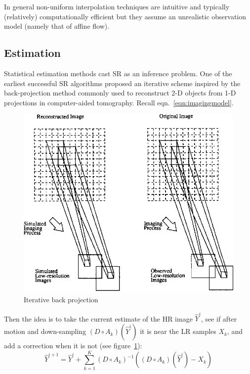In general non-uniform interpolation techniques are intuitive and typically (relatively) computationally efficient but they assume an unrealistic observation model (namely that of affine flow).

\subsection{Estimation}\label{subsec:estimation}

Statistical estimation methods cast SR as an inference problem.
%
One of the earliest successful SR algorithms\cite{Irani1991ImprovingRB} proposed an iterative scheme inspired by the back-projection method commonly used to reconstruct 2-D objects from 1-D projections in computer-aided tomography.
%
Recall eqn.~\ref{eqn:imagingmodel}.
\begin{figure}
    \centering
    \includegraphics[width=\linewidth,keepaspectratio]{figures/3-Figure1-1.png}
    \caption{Iterative back projection\cite{Irani1991ImprovingRB}}
    \label{fig:iterbackproj}
\end{figure}
%
Then the idea is to take the current estimate of the HR image $\hat{Y}^{i}$, see if after motion and down-sampling $(D \circ A_k)(\hat{Y}^i)$ it is near the LR samples $X_k$, and add a correction when it is not (see figure~\ref{fig:iterbackproj}):
\begin{equation}
    \hat{Y}^{i+1} = \hat{Y}^i + \sum_{k=1}^K (D \circ A_k)^{-1}\left( (D \circ A_k)(\hat{Y}^i) - X_k \right)
    \label{eqn:ibp}
\end{equation}
